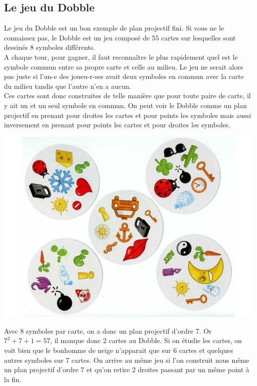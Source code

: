 \documentclass[a4paper]{article}
\begin{document}
\subsection{Le jeu du Dobble}
Le jeu du Dobble est un bon exemple de plan projectif fini. Si vous ne le connaissez pas, le Dobble est un jeu composé de 55 cartes sur lesquelles sont dessinés 8 symboles\vspace{1\baselineskip} différents.\\
  A chaque tour, pour gagner, il faut reconnaître le plus rapidement quel est le symbole commun entre sa propre carte et celle au milieu. Le jeu ne serait alors pas juste si l'un-e des joueu-r-ses avait deux symboles en commun avec la carte du milieu tandis que l'autre n'en\vspace{1\baselineskip} a aucun. \\
  Ces cartes sont donc construites de telle manière que pour toute paire de carte, il y ait un et un seul symbole en commun. On peut voir le Dobble comme un plan projectif en prenant pour droites les cartes et pour points les symboles mais aussi inversement en prenant pour points les cartes et pour droites les symboles.\vspace{1\baselineskip}\\
\begin{center}
\includegraphics[scale=0.3]{dobble-2.jpg}
\end{center}
Avec 8 symboles par carte, on a donc un plan projectif d'ordre 7. Or $7^2+7+1=57$, il manque donc 2 cartes au Dobble. Si on étudie les cartes, on voit bien que le bonhomme de neige n'apparait que sur 6 cartes et quelques autres symboles sur 7 cartes. On arrive au même jeu si l'on construit nous même un plan projectif d'ordre 7 et qu'on retire 2 droites passant par un même point à la fin.\vspace{1\baselineskip}\\
\end{document}
